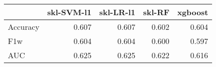 \begin{tabular}{lrrrr}
\toprule
{} &  skl-SVM-l1 &  skl-LR-l1 &  skl-RF &  xgboost \\
\midrule
Accuracy &       0.607 &      0.607 &   0.602 &    0.604 \\
F1w      &       0.604 &      0.604 &   0.600 &    0.597 \\
AUC      &       0.625 &      0.625 &   0.622 &    0.616 \\
\bottomrule
\end{tabular}
